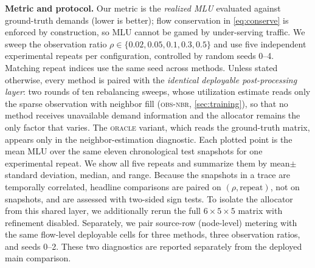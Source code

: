 \textbf{Metric and protocol.} Our metric is the \emph{realized MLU}
evaluated against ground-truth demands (lower is better); flow
conservation in \cref{eq:conserve} is enforced by construction, so MLU
cannot be gamed by under-serving traffic. We sweep the observation
ratio $\rho \in \{0.02, 0.05, 0.1, 0.3, 0.5\}$ and use five independent
experimental repeats per configuration, controlled by random seeds
0--4. Matching repeat indices use the same seed across methods. Unless
stated otherwise, every method is paired with the \emph{identical deployable
post-processing layer}: two rounds of ten rebalancing sweeps, whose
utilization estimate reads only the sparse observation with neighbor fill
(\textsc{obs-nbr}, \cref{sec:training}),
so that no method receives unavailable demand information and the
allocator remains the only factor that varies. The \textsc{oracle} variant,
which reads the ground-truth matrix, appears only in the neighbor-estimation
diagnostic. Each plotted point is the mean MLU over the same eleven
chronological test snapshots for one experimental repeat. We show all five
repeats and summarize them by mean$\pm$standard deviation, median, and range.
Because the snapshots in a trace are temporally correlated, headline
comparisons are paired on $(\rho,\text{repeat})$, not on snapshots, and are
assessed with two-sided sign tests. To isolate the allocator from this shared
layer, we additionally rerun the full $6\mathbin{\times}5\mathbin{\times}5$
matrix with refinement disabled. Separately, we pair source-row
(node-level) metering with the same flow-level deployable cells for three
methods, three observation ratios, and seeds 0--2. These two diagnostics are
reported separately from the deployed main comparison.

